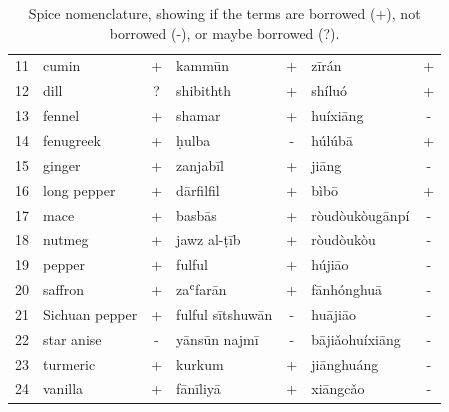 \begin{table}[h]
\begin{tabular}{@{}rlclclc@{}}
    11          & cumin            & +           & kammūn           & +           & zīrán            & +           \\
    12          & dill             & ?           & shibithth        & +           & shíluó           & +           \\
    13          & fennel           & +           & shamar           & +           & huíxiāng         & -           \\
    14          & fenugreek        & +           & ḥulba            & -           & húlúbā           & +           \\
    15          & ginger           & +           & zanjabīl         & +           & jiāng            & -           \\
    16          & long pepper      & +           & dārfilfil        & +           & bìbō             & +           \\
    17          & mace             & +           & basbās           & +           & ròudòukòugānpí   & -           \\
    18          & nutmeg           & +           & jawz al-ṭīb      & +           & ròudòukòu        & -           \\
    19          & pepper           & +           & fulful           & +           & hújiāo           & -           \\
    20          & saffron          & +           & zaʿfarān         & +           & fānhónghuā       & -           \\
    21          & Sichuan pepper   & +           & fulful sītshuwān & -           & huā​jiāo         & -           \\
    22          & star anise       & -           & yānsūn najmī     & -           & bājiǎohuíxiāng   & -           \\
    23          & turmeric         & +           & kurkum           & +           & jiānghuáng       & -           \\
    24          & vanilla          & +           & fānīliyā         & +           & xiāngcǎo         & -           \\ \bottomrule
    \end{tabular}
    \caption[Spice nomenclature, showing if the terms are borrowed or not.]{Spice nomenclature, showing if the terms are borrowed (+), not borrowed (-), or maybe borrowed (?).}
    \label{table:borrowings}
    \end{table}



